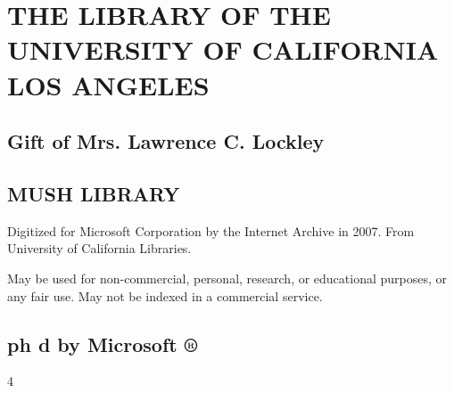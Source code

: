 \chapter{THE LIBRARY OF THE UNIVERSITY OF CALIFORNIA LOS ANGELES}

\section{Gift of Mrs. Lawrence C. Lockley}

\section{MUSH LIBRARY}

Digitized for Microsoft Corporation by the Internet Archive in 2007. From University of California Libraries.

May be used for non-commercial, personal, research, or educational purposes, or any fair use. May not be indexed in a commercial service.

\section{ph d by Microsoft ®}

4
